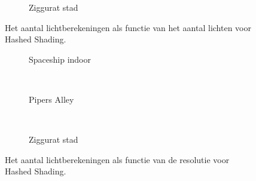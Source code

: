 \begin{figure}[t]
\begin{minipage}[t]{0.5\textwidth}
  \begin{adjustbox}{minipage=\textwidth, scale=0.55}
    \begin{subfigure}[b]{1.6\textwidth}
      \centering
      \def\svgwidth{\textwidth}
      
      \caption{Ziggurat stad}
      \label{fig:hs-compare-lights:lc:city}
    \end{subfigure}
  \end{adjustbox}
  \caption{\small Het aantal lichtberekeningen als functie van het aantal lichten voor Hashed Shading.}
  \label{fig:hs-compare-lights:lc}
  \end{minipage}
  \begin{minipage}[t]{0.5\textwidth}
  \begin{adjustbox}{minipage=\textwidth, scale=0.55}
    \begin{subfigure}[b]{1.6\textwidth}
      \centering
      \def\svgwidth{\textwidth}
      
      \caption{Spaceship indoor}
      \vspace{4pt}
      \label{fig:hs-compare-resolution:lc:indoor}
    \end{subfigure}
  \end{adjustbox} \\
  \begin{adjustbox}{minipage=\textwidth, scale=0.55}
    \begin{subfigure}[b]{1.6\textwidth}
      \centering
      \def\svgwidth{\textwidth}
      
      \caption{Pipers Alley}
      \vspace{4pt}
      \label{fig:hs-compare-resolution:lc:alley}
    \end{subfigure}
  \end{adjustbox} \\
  \begin{adjustbox}{minipage=\textwidth, scale=0.55}
    \begin{subfigure}[b]{1.6\textwidth}
      \centering
      \def\svgwidth{\textwidth}
      
      \caption{Ziggurat stad}
      \label{fig:hs-compare-resolution:lc:city}
    \end{subfigure}
  \end{adjustbox}
  \caption{\small Het aantal lichtberekeningen als functie van de resolutie voor Hashed Shading.}
  \label{fig:hs-compare-resolution:lc}
  \end{minipage}
\end{figure}
